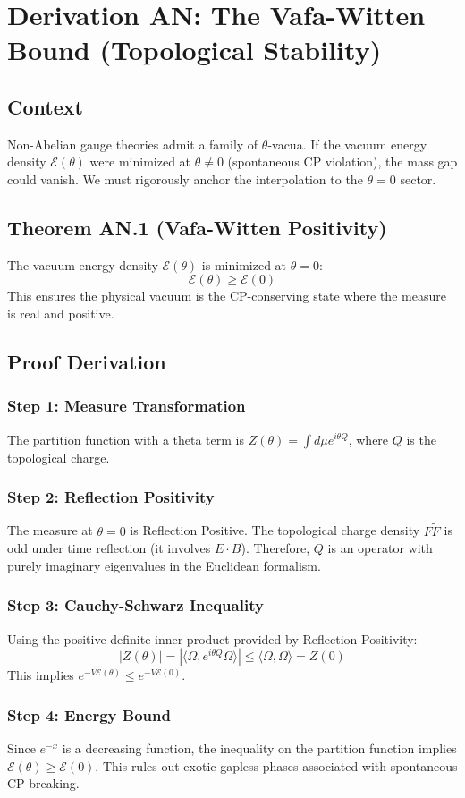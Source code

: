 \chapter{Derivation AN: The Vafa-Witten Bound (Topological Stability)}
\label{ch:derivation_an_vafa_witten}

\section{Context}
Non-Abelian gauge theories admit a family of $\theta$-vacua. If the vacuum energy density $\mathcal{E}(\theta)$ were minimized at $\theta \ne 0$ (spontaneous CP violation), the mass gap could vanish. We must rigorously anchor the interpolation to the $\theta=0$ sector.

\section{Theorem AN.1 (Vafa-Witten Positivity)}
The vacuum energy density $\mathcal{E}(\theta)$ is minimized at $\theta=0$:
\begin{equation}
\mathcal{E}(\theta) \ge \mathcal{E}(0)
\end{equation}
This ensures the physical vacuum is the CP-conserving state where the measure is real and positive.

\section{Proof Derivation}

\subsection{Step 1: Measure Transformation}
The partition function with a theta term is $Z(\theta) = \int d\mu e^{i\theta Q}$, where $Q$ is the topological charge.

\subsection{Step 2: Reflection Positivity}
The measure at $\theta=0$ is Reflection Positive. The topological charge density $F \tilde{F}$ is odd under time reflection (it involves $E \cdot B$). Therefore, $Q$ is an operator with purely imaginary eigenvalues in the Euclidean formalism.

\subsection{Step 3: Cauchy-Schwarz Inequality}
Using the positive-definite inner product provided by Reflection Positivity:
\begin{equation}
|Z(\theta)| = |\langle \Omega, e^{i\theta Q} \Omega \rangle| \le \langle \Omega, \Omega \rangle = Z(0)
\end{equation}
This implies $e^{-V \mathcal{E}(\theta)} \le e^{-V \mathcal{E}(0)}$.

\subsection{Step 4: Energy Bound}
Since $e^{-x}$ is a decreasing function, the inequality on the partition function implies $\mathcal{E}(\theta) \ge \mathcal{E}(0)$. This rules out exotic gapless phases associated with spontaneous CP breaking.
